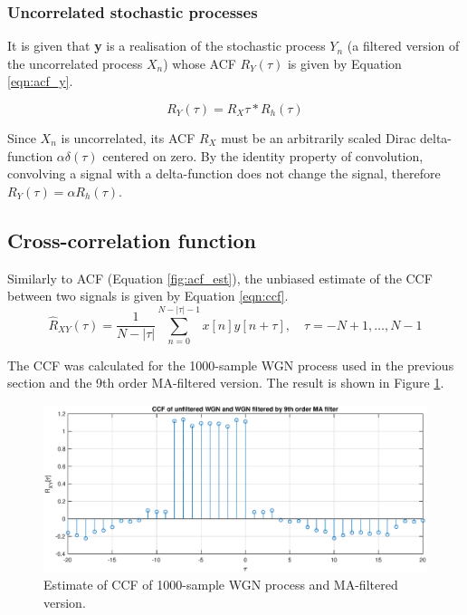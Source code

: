 \subsubsection{Uncorrelated stochastic processes}

It is given that \textbf{y} is a realisation of the stochastic process $Y_{n}$ (a filtered version of the uncorrelated process $X_{n}$) whose ACF $R_{Y}(\tau)$ is given by Equation \ref{eqn:acf_y}.

\begin{equation}
R_{Y}(\tau)=R_{X} \tau * R_{h}(\tau)
\label{eqn:acf_y}
\end{equation}

\noindent
Since $X_{n}$ is uncorrelated, its ACF $R_{X}$ must be an arbitrarily scaled Dirac delta-function $\alpha \delta(\tau)$ centered on zero. By the identity property of convolution, convolving a signal with a delta-function does not change the signal, therefore $R_{Y}(\tau) = \alpha R_{h}(\tau)$.

\subsection{Cross-correlation function}

Similarly to ACF (Equation \ref{fig:acf_est}), the unbiased estimate of the CCF between two signals is given by Equation \ref{eqn:ccf}. 
\begin{equation}
\hat{R}_{X Y}(\tau)=\frac{1}{N-|\tau|} \sum_{n=0}^{N-|\tau|-1} x[n] y[n+\tau], \quad \tau=-N+1, \ldots, N-1
\label{eqn:ccf}
\end{equation}

\noindent
The CCF was calculated for the 1000-sample WGN process used in the previous section and the 9th order MA-filtered version. The result is shown in Figure \ref{fig:ccf}.

\begin{figure}[H]
    \centering
    \includegraphics[width=12cm]{assignment2figs/ccf.eps}
    \caption{Estimate of CCF of 1000-sample WGN process and MA-filtered version.}
    \label{fig:ccf}
\end{figure}

